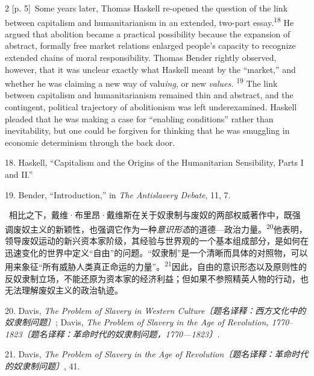 \documentclass[10pt,a4paper]{article}
\begin{document}
\begin{paracol}{2}
\switchcolumn
{\scriptsize\color{gray} [p. 5]}\ Some years later, Thomas Haskell re-opened the question of the link between capitalism and humanitarianism in an extended, two-part essay.\nobreak\textsuperscript{18} He argued that abolition became a practical possibility because the expansion of abstract, formally free market relations enlarged people’s capacity to recognize extended chains of moral responsibility. Thomas Bender rightly observed, however, that it was unclear exactly what Haskell meant by the “market,” and whether he was claiming a new way of valu\textit{ing}, or new \textit{values.} \nobreak\textsuperscript{19} The link between capitalism and humanitarianism remained thin and abstract, and the contingent, political trajectory of abolitionism was left underexamined. Haskell pleaded that he was making a case for “enabling conditions” rather than inevitability, but one could be forgiven for thinking that he was smuggling in economic determinism through the back door.\par{\small 18. Haskell, “Capitalism and the Origins of the Humanitarian Sensibility, Parts I and II.”\par}{\small 19. Bender, “Introduction,” in \textit{The Antislavery Debate}, 11, 7.\par}
\switchcolumn*
{\scriptsize\color{gray} [p. 5]}\ 相比之下，戴维·布里昂·戴维斯在关于奴隶制与废奴的两部权威著作中，既强调废奴主义的新颖性，也强调它作为一种\textit{意识形态}的道德—政治力\mbox{量。\textsuperscript{20}}他表明，领导废奴运动的新兴资本家阶级，其经验与世界观的一个基本组成部分，是如何在迅速变化的世界中定义“自由”的问题。“奴隶制”是一个清晰而具体的对照物，可以用来象征“所有威胁人类真正命运的力量”。\nobreak\textsuperscript{21}因此，自由的意识形态以及原则性的反奴隶制立场，不能还原为资本家的经济利益；但如果不参照精英人物的行动，也无法理解废奴主义的政治轨迹。\par{\small 20. Davis, \textit{The Problem of Slavery in Western Culture〔题名译释：西方文化中的奴隶制问题〕}; Davis, \textit{The Problem of Slavery in the Age of Revolution, 1770–1823〔题名译释：革命时代的奴隶制问题，1770—1823〕.}\par}{\small 21. Davis, \textit{The Problem of Slavery in the Age of Revolution〔题名译释：革命时代的奴隶制问题〕}, 41.\par}
\switchcolumn

\end{paracol}
\end{document}

